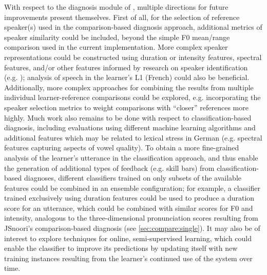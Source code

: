 	
	With respect to the diagnosis module of , multiple directions for future improvements present themselves. 
	First of all, for the selection of reference speaker(s) used in the comparison-based diagnosis approach, additional metrics of speaker similarity could be included, beyond the simple F0 mean/range comparison used in the current implementation. More complex speaker representations could be constructed using duration or intensity features, spectral features, and/or other features informed by research on speaker identification (e.g. \cite{Shriberg2005}); analysis of speech in the learner's L1 (French) could also be beneficial. Additionally, more complex approaches for combining the results from multiple individual learner-reference comparisons could be explored, e.g. incorporating the speaker selection metrics to weight comparisons with ``closer'' references more highly. 
	Much work also remains to be done with respect to classification-based diagnosis, including evaluations using different machine learning algorithms and additional features which may be related to lexical stress in German (e.g. spectral features capturing aspects of vowel quality). To obtain a more fine-grained analysis of the learner's utterance in the classification approach, and thus enable the generation of additional types of feedback (e.g. skill bars) from classification-based diagnoses, different classifiers trained on only subsets of the available features could be combined in an ensemble configuration; for example, a classifier trained exclusively using duration features could be used to produce a duration score for an utterance, which could be combined with similar scores for F0 and intensity, analogous to the three-dimensional pronunciation scores resulting from JSnoori's comparison-based diagnosis (see \cref{sec:compare:single}). It may also be of interest to explore techniques for online, semi-supervised learning, which could enable the classifier to improve its predictions by updating itself with new training instances resulting from the learner's continued use of the system over time.
	
	
